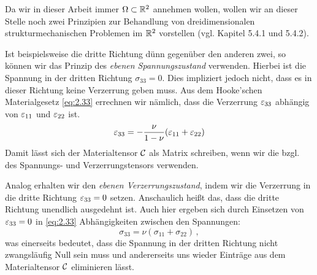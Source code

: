 Da wir in dieser Arbeit immer $\Omega \subset \mathbb{R}^2$ annehmen wollen, wollen wir an dieser Stelle noch zwei Prinzipien zur Behandlung von dreidimensionalen strukturmechanischen Problemen im $\mathbb{R}^2$ vorstellen (vgl. \cite{WriggersFEMSkript} Kapitel 5.4.1 und 5.4.2).

Ist beispielsweise die dritte Richtung dünn gegenüber den anderen zwei, so können wir das Prinzip des \textit{ebenen Spannungszustand} verwenden. Hierbei ist die Spannung in der dritten Richtung $\sigma_{33} = 0$. Dies impliziert jedoch nicht, dass es in dieser Richtung keine Verzerrung geben muss. Aus dem Hooke'schen Materialgesetz \eqref{eq:2.33} errechnen wir nämlich, dass die Verzerrung $\varepsilon_{33}$ abhängig von $\varepsilon_{11}$ und $\varepsilon_{22}$ ist.
\[
	\varepsilon_{33} = -\frac \nu{1-\nu} (\varepsilon_{11}+\varepsilon_{22}) 
\]
Damit lässt sich der Materialtensor $\mathcal C$ als Matrix schreiben, wenn wir die \textit{} bzgl. des Spannungs- und Verzerrungstensors verwenden.


Analog erhalten wir den \textit{ebenen Verzerrungszustand}, indem wir die Verzerrung in die dritte Richtung $\varepsilon_{33} = 0$ setzen. Anschaulich heißt das, dass die dritte Richtung unendlich ausgedehnt ist. Auch hier ergeben sich  durch Einsetzen von $\varepsilon_{33}=0$ in \eqref{eq:2.33} Abhängigkeiten zwischen den Spannungen:
\[
	\sigma_{33} = \nu(\sigma_{11}+\sigma_{22}) \, ,
\]
was einerseits bedeutet, dass die Spannung in der dritten Richtung nicht zwangsläufig Null sein muss und andererseits uns wieder Einträge aus dem Materialtensor $\mathcal C$ eliminieren lässt.



\newpage

